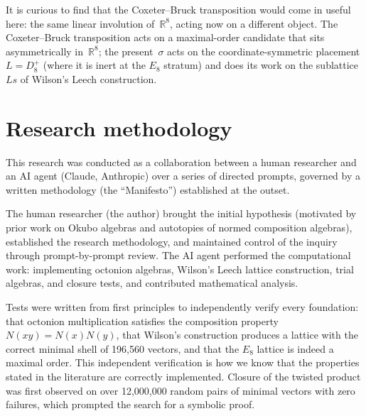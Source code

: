 \documentclass[twoside,english]{paper}
\numberwithin{equation}{section}
\numberwithin{figure}{section}
\theoremstyle{definition}
\theoremstyle{remark}
\newcommand{\RR}{\mathbb{R}}
\newcommand{\Nrm}{N}                  %
\begin{document}
It is curious to find that the Coxeter--Bruck transposition would
come in useful here: the same linear involution of~$\RR^8$, acting
now on a different object.  The Coxeter--Bruck transposition acts
on a maximal-order candidate that sits asymmetrically in~$\RR^8$;
the present~$\sigma$ acts on the coordinate-symmetric placement
$L = D_8^+$ (where it is inert at the $E_8$ stratum) and does its
work on the sublattice~$Ls$ of Wilson's Leech construction.

\section{Research methodology}\label{sec:methodology}

This research was conducted as a collaboration between a human
researcher and an AI agent (Claude, Anthropic) over a series of
directed prompts, governed by a written methodology (the
``Manifesto'') established at the outset.

The human researcher (the author) brought the initial hypothesis
(motivated by prior work on Okubo algebras and autotopies of normed
composition algebras), established the research methodology, and
maintained control of the inquiry through prompt-by-prompt review.
The AI agent performed the computational work: implementing octonion
algebras, Wilson's Leech lattice construction, trial algebras, and
closure tests, and contributed mathematical analysis.

Tests were written from first principles to independently verify
every foundation: that octonion multiplication satisfies the
composition property $\Nrm(xy) = \Nrm(x)\Nrm(y)$, that Wilson's
construction produces a lattice with the correct minimal shell of
196{,}560 vectors, and that the $E_8$ lattice is indeed a maximal
order.  This independent verification is how we know that the
properties stated in the literature are correctly implemented.
Closure of the twisted product was first observed on over
12{,}000{,}000 random pairs of minimal vectors with zero failures,
which prompted the search for a symbolic proof.
\end{document}
